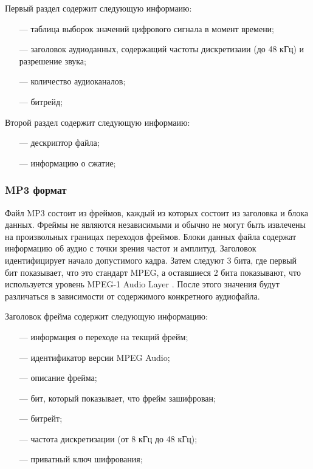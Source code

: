 		\par Первый раздел содержит следующую информаию:
		\begin{itemize}
			\item[---] таблица выборок значений цифрового сигнала в момент времени;
			\item[---] заголовок аудиоданных, содержащий частоты дискретизаии (до 48 кГц) и разрешение звука;
			\item[---] количество аудиоканалов;
			\item[---] битрейд;
		\end{itemize}

		\par Второй раздел содержит следующую информаию:
		\begin{itemize}
			\item[---] дескриптор файла;
			\item[---] информацию о сжатие;
		\end{itemize}

	
	\subsubsection{MP3 формат}
		\par Файл MP3 \cite{mp3} состоит из фреймов, каждый из которых состоит из заголовка и блока данных. 
		Фреймы не являются независимыми и обычно не могут быть извлечены на произвольных границах переходов фреймов. 
		Блоки данных файла содержат информацию об аудио с точки зрения частот и амплитуд. 
		Заголовок идентифицирует начало допустимого кадра. 
		Затем следуют 3 бита, где первый бит показывает, что это стандарт MPEG, а оставшиеся 2 бита показывают, что используется уровень MPEG-1 Audio Layer \cite{mpeg}. 
		После этого значения будут различаться в зависимости от содержимого конкретного аудиофайла.

		\par Заголовок фрейма содержит следующую информацию:
		\begin{itemize}
			\item[---] информация о переходе на текщий фрейм;
			\item[---] идентификатор версии MPEG Audio;
			\item[---] описание фрейма;
			\item[---] бит, который показывает, что фрейм зашифрован;
			\item[---] битрейт;
			\item[---] частота дискретизации (от 8 кГц до 48 кГц);
			\item[---] приватный ключ шифрования;
		\end{itemize}
	
